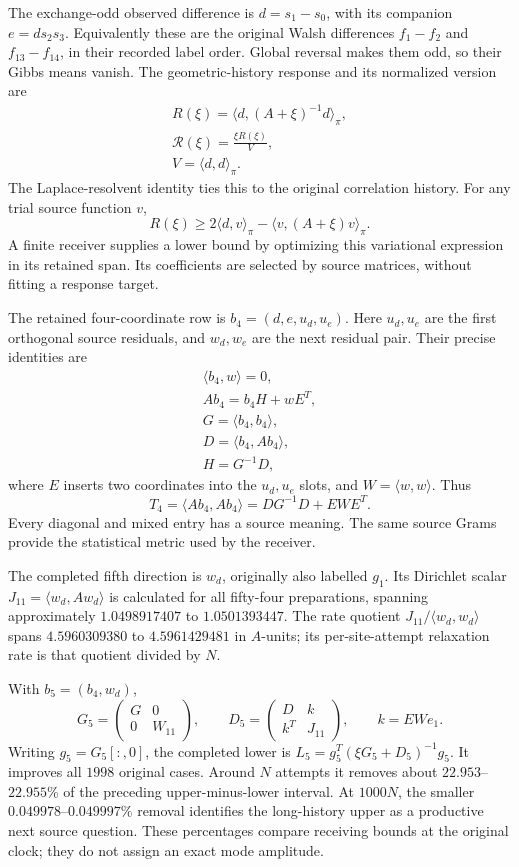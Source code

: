 The exchange-odd observed difference is $d=s_1-s_0$, with its companion $e=d s_2s_3$. Equivalently these are the original Walsh differences $f_1-f_2$ and $f_{13}-f_{14}$, in their recorded label order. Global reversal makes them odd, so their Gibbs means vanish. The geometric-history response and its normalized version are
\[
\begin{gathered}
R(\xi)=\langle d,(A+\xi)^{-1}d\rangle_\pi,
 \\
\mathcal R(\xi)=\frac{\xi R(\xi)}V,
 \\
V=\langle d,d\rangle_\pi.
\end{gathered}
\]
The Laplace-resolvent identity ties this to the original correlation history. For any trial source function $v$,
\[
 R(\xi)\geq2\langle d,v\rangle_\pi
                       -\langle v,(A+\xi)v\rangle_\pi.
\]
A finite receiver supplies a lower bound by optimizing this variational expression in its retained span. Its coefficients are selected by source matrices, without fitting a response target. 

The retained four-coordinate row is $b_4=(d,e,u_d,u_e)$. Here $u_d,u_e$ are the first orthogonal source residuals, and $w_d,w_e$ are the next residual pair. Their precise identities are
\[
\begin{gathered}
\langle b_4,w\rangle=0,\\
Ab_4=b_4H+wE^T,\\
G=\langle b_4,b_4\rangle,\\
D=\langle b_4,Ab_4\rangle,
 \\
H=G^{-1}D,
\end{gathered}
\]
where $E$ inserts two coordinates into the $u_d,u_e$ slots, and $W=\langle w,w\rangle$. Thus
\[
 T_4=\langle Ab_4,Ab_4\rangle=DG^{-1}D+EWE^T.
\]
Every diagonal and mixed entry has a source meaning. The same source Grams provide the statistical metric used by the receiver.

The completed fifth direction is $w_d$, originally also labelled $g_1$. Its Dirichlet scalar $J_{11}=\langle w_d,Aw_d\rangle$ is calculated for all fifty-four preparations, spanning approximately $1.0498917407$ to $1.0501393447$. The rate quotient $J_{11}/\langle w_d,w_d\rangle$ spans $4.5960309380$ to $4.5961429481$ in $A$-units; its per-site-attempt relaxation rate is that quotient divided by $N$.

With $b_5=(b_4,w_d)$,
\[
 G_5=\begin{pmatrix}G&0\\0&W_{11}\end{pmatrix},\qquad
 D_5=\begin{pmatrix}D&k\\k^T&J_{11}\end{pmatrix},
 \qquad k=EWe_1.
\]
Writing $g_5=G_5[:,0]$, the completed lower is $L_5=g_5^T(\xi G_5+D_5)^{-1}g_5$. It improves all $1998$ original cases. Around $N$ attempts it removes about $22.953$--$22.955\%$ of the preceding upper-minus-lower interval. At $1000N$, the smaller $0.049978$--$0.049997\%$ removal identifies the long-history upper as a productive next source question. These percentages compare receiving bounds at the original clock; they do not assign an exact mode amplitude.

